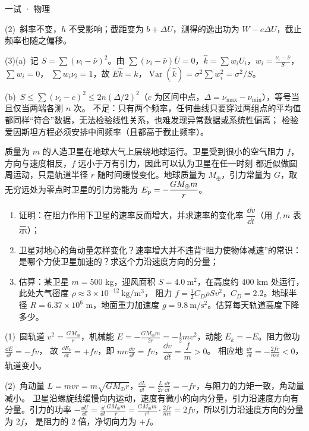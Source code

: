 \documentclass[cjk=noto, seal=first]{mojing-exam}
\begin{document}
\begin{paper}[time={建议 2 小时（训练设置）}, full=100]{一试 · 物理}
\begin{questions}
\begin{solution}
(2)~斜率不变，$h$ 不受影响；截距变为 $b+\Delta U$，测得的逸出功为 $W-e\Delta U$，截止频率也随之偏移。

(3)(a)~记 $S=\sum(\nu_i-\bar\nu)^2$。由 $\sum(\nu_i-\bar\nu)\bar U=0$，$\hat k=\sum w_iU_i$，$w_i=\frac{\nu_i-\bar\nu}S$，$\sum w_i=0$，
$\sum w_i\nu_i=1$，故 $E\hat k=k$，$\operatorname{Var}(\hat k)=\sigma^2\sum w_i^2=\sigma^2/S$。

(b)~$S\le\sum(\nu_i-c)^2\le2n(\Delta/2)^2$（$c$ 为区间中点，$\Delta=\nu_{\max}-\nu_{\min}$），等号当且仅当两端各测 $n$ 次。
不足：只有两个频率，任何曲线只要穿过两组点的平均值都同样“符合”数据，无法检验线性关系，也难发现异常数据或系统性偏离；
检验爱因斯坦方程必须安排中间频率（且都高于截止频率）。
\end{solution}

\question[20]
质量为 $m$ 的人造卫星在地球大气上层绕地球运行。卫星受到很小的空气阻力 $f$，方向与速度相反，$f$ 远小于万有引力，因此可以认为卫星在任一时刻
都近似做圆周运动，只是轨道半径 $r$ 随时间缓慢变化。地球质量为 $M_\oplus$，引力常量为 $G$，取无穷远处为零点时卫星的引力势能为 $E_{\rm p}=-\dfrac{GM_\oplus m}{r}$。
\begin{enumerate}
  \item 证明：在阻力作用下卫星的速率反而增大，并求速率的变化率 $\dfrac{\dd v}{\dd t}$（用 $f,m$ 表示）；
  \item 卫星对地心的角动量怎样变化？速率增大并不违背“阻力使物体减速”的常识：是哪个力使卫星加速的？求这个力沿速度方向的分量；
  \item 估算：某卫星 $m=500$ kg，迎风面积 $S=4.0\ \mathrm{m^2}$，在高度约 $400$ km 处运行，此处大气密度 $\rho\approx3\times10^{-12}\ \mathrm{kg/m^3}$，
        阻力 $f=\frac12C_D\rho Sv^2$，$C_D=2.2$。地球半径 $R=6.37\times10^6$ m，地面重力加速度 $g=9.8\ \mathrm{m/s^2}$。估算每天轨道高度下降多少。
\end{enumerate}
\answerspace{2cm}
\begin{solution}
(1)~圆轨道 $v^2=\frac{GM_\oplus}r$，机械能 $E=-\frac{GM_\oplus m}{2r}=-\frac12mv^2$，动能 $E_k=-E$。阻力做功 $\frac{\dd E}{\dd t}=-fv$，
故 $\frac{\dd E_k}{\dd t}=+fv$，即 $mv\frac{\dd v}{\dd t}=fv$，$\dfrac{\dd v}{\dd t}=\dfrac fm>0$。
相应地 $\frac{\dd r}{\dd t}=-\frac{2fr}{mv}<0$，轨道变小。

(2)~角动量 $L=mvr=m\sqrt{GM_\oplus r}$，$\frac{\dd L}{\dd t}=\frac{L}{2r}\frac{\dd r}{\dd t}=-fr$，与阻力的力矩一致，角动量减小。
卫星沿螺旋线缓慢向内运动，速度有微小的向内分量，引力沿速度方向有分量。引力的功率
$-\frac{\dd U}{\dd t}=\frac{\dd}{\dd t}\frac{GM_\oplus m}{r}=\frac{GM_\oplus m}{r^2}\cdot\frac{2fr}{mv}=2fv$，所以引力沿速度方向的分量为 $2f$，
是阻力的 $2$ 倍，净切向力为 $+f$。


\end{solution}
\end{questions}
\end{paper}
\end{document}
